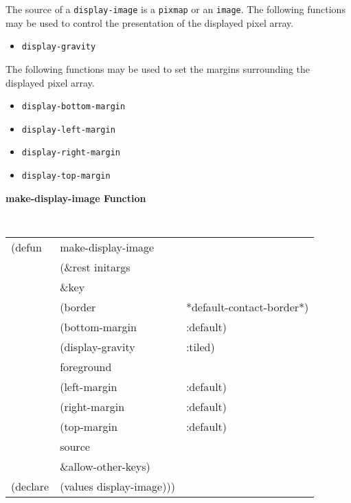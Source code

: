 The source of a {\tt display-image} is a {\tt pixmap} or an {\tt image}.  The
following functions may be used to control the presentation of the displayed pixel
array.

\begin{itemize}    
\item {\tt display-gravity} 
\end{itemize}

The following functions may be used to set the margins surrounding the displayed
pixel array.

\begin{itemize}
 \item {\tt display-bottom-margin}
 \item {\tt display-left-margin}
 \item {\tt display-right-margin}
 \item {\tt display-top-margin}
\end{itemize}

\pagebreak


{\samepage
{\large {\bf make-display-image \hfill Function}} 
\begin{flushright} \parbox[t]{6.125in}{
\tt
\begin{tabular}{lll}
\raggedright
(defun & make-display-image \\
       & (\&rest initargs \\
       & \&key  \\
       &   (border              & *default-contact-border*) \\ 
       &   (bottom-margin       & :default) \\ 
       &   (display-gravity     & :tiled) \\
       &   foreground \\
       &   (left-margin         & :default) \\ 
       &   (right-margin        & :default) \\ 
       &   (top-margin          & :default) \\
       &   source              & \\ 
       &   \&allow-other-keys) \\
(declare & (values   display-image)))
\end{tabular}
\rm

}\end{flushright}}

